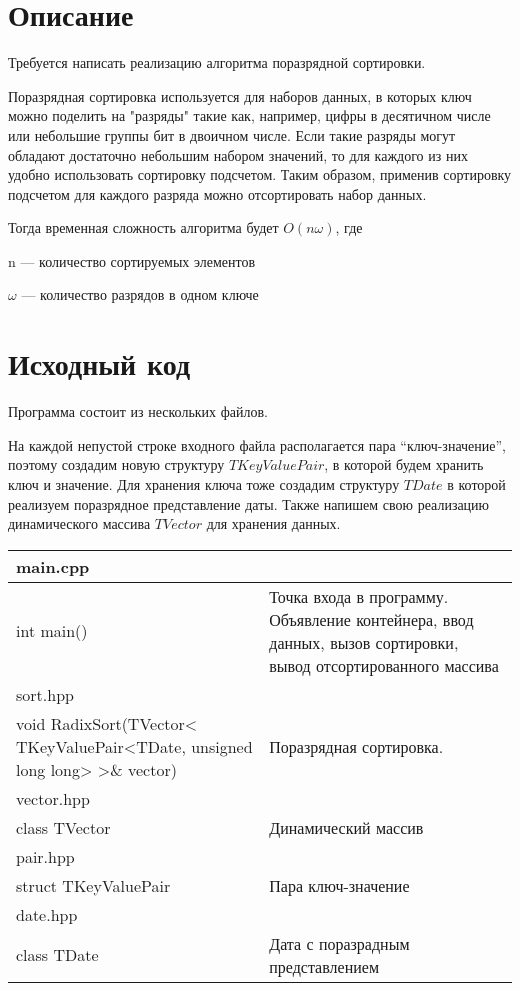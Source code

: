 \section{Описание}
Требуется написать реализацию алгоритма поразрядной сортировки.

Поразрядная сортировка используется для наборов данных, в которых ключ можно поделить на "разряды" такие как,
например, цифры в десятичном числе или небольшие группы бит в двоичном числе.
Если такие разряды могут обладают достаточно небольшим набором значений, то для каждого из них удобно использовать сортировку подсчетом.
Таким образом, применив сортировку подсчетом для каждого разряда можно отсортировать набор данных.

Тогда временная сложность алгоритма будет $O(n\omega)$, где

n --- количество сортируемых элементов

$\omega$ --- количество разрядов в одном ключе

\pagebreak

\section{Исходный код}
Программа состоит из нескольких файлов.

На каждой непустой строке входного файла располагается пара \enquote{ключ-значение}, поэтому создадим новую 
структуру $TKeyValuePair$, в которой будем хранить ключ и значение.
Для хранения ключа тоже создадим структуру $TDate$ в которой реализуем поразрядное представление даты.
Также напишем свою реализацию динамического массива $TVector$ для хранения данных.

\begin{longtable}{|p{7.5cm}|p{7.5cm}|}
\hline
\rowcolor{lightgray}
\multicolumn{2}{|c|} {main.cpp}\\
\hline
int main()&Точка входа в программу. Объявление контейнера, ввод данных, вызов сортировки, вывод отсортированного массива\\
\hline
\rowcolor{lightgray}
\multicolumn{2}{|c|} {sort.hpp}\\
\hline
void RadixSort(TVector< TKeyValuePair<TDate, unsigned long long> >\& vector)&Поразрядная сортировка.\\
\hline
\rowcolor{lightgray}
\multicolumn{2}{|c|} {vector.hpp}\\
\hline
class TVector&Динамический массив\\
\hline
\rowcolor{lightgray}
\multicolumn{2}{|c|} {pair.hpp}\\
\hline
struct TKeyValuePair&Пара ключ-значение\\
\hline
\rowcolor{lightgray}
\multicolumn{2}{|c|} {date.hpp}\\
\hline
class TDate&Дата с поразрадным представлением\\
\hline
\end{longtable}

